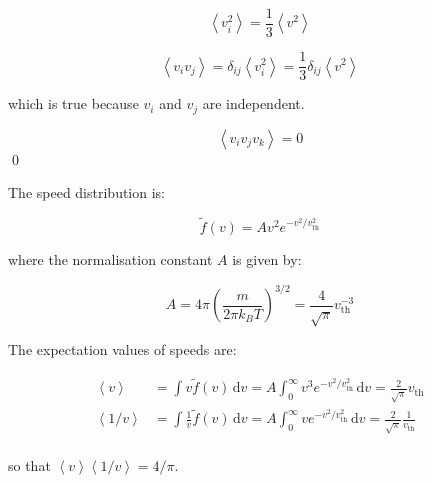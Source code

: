 \documentclass[12pt]{article}
\begin{document}

\begin{equation}
    \left\langle v_{i}^{2} \right\rangle = \frac{1}{3} \left\langle v^{2} \right\rangle
\end{equation}


\begin{equation}
    \left\langle v_{i} v_{j} \right\rangle = \delta_{ij} \left\langle v_{i}^{2} \right\rangle = \frac{1}{3} \delta_{ij} \left\langle v^{2} \right\rangle
\end{equation}

which is true because $v_{i}$ and $v_{j}$ are independent.


\begin{equation}
    \left\langle v_{i} v_{j} v_{k} \right\rangle = 0
\end{equation}
\qed



The speed distribution is:

\begin{equation}
    \tilde{f}(v) = A v^{2} e^{-v^{2}/v_{\text{th}}^{2}}
\end{equation}

where the normalisation constant $A$ is given by:

\begin{equation}
    A = 4\pi \left( \frac{m}{2\pi k_{B}T} \right)^{3/2} = \frac{4}{\sqrt{\pi}} v_{\text{th}}^{-3}
\end{equation}

The expectation values of speeds are:

\begin{equation}
    \begin{split}
        \left\langle v \right\rangle &= \int v \tilde{f}(v) \, \mathrm{d}v = A \int_{0}^{\infty} v^{3} e^{-v^{2}/v_{\text{th}}^{2}} \, \mathrm{d}v = \frac{2}{\sqrt{\pi}} v_{\text{th}} \\
        \left\langle 1/v \right\rangle &= \int \frac{1}{v} \tilde{f}(v) \, \mathrm{d}v = A \int_{0}^{\infty} v e^{-v^{2}/v_{\text{th}}^{2}} \, \mathrm{d}v = \frac{2}{\sqrt{\pi}} \frac{1}{v_{\text{th}}} \\
    \end{split}
\end{equation}

so that $\left\langle v \right\rangle \left\langle 1/v \right\rangle = 4/\pi$.
\end{document}
